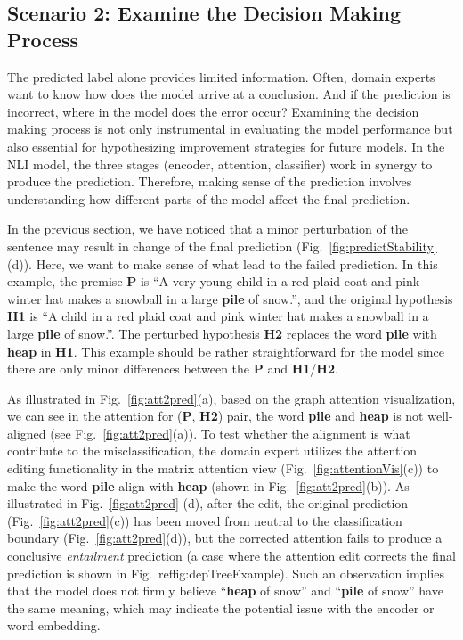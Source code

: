 \subsection{Scenario 2: Examine the Decision Making Process}
The predicted label alone provides limited information. Often, domain experts want to know how does the model arrive at a conclusion. And if the prediction is incorrect, where in the model does the error occur?
Examining the decision making process is not only instrumental in evaluating the model performance but also essential for hypothesizing improvement strategies for future models.
%
In the NLI model, the three stages (encoder, attention, classifier) work in synergy to produce the prediction.
Therefore, making sense of the prediction involves understanding how different parts of the model affect the final prediction.

In the previous section, we have noticed that a minor perturbation of the sentence may result in change of the final prediction (Fig.~\ref{fig:predictStability}(d)). Here, we want to make sense of what lead to the failed prediction. In this example, the premise \textbf{P} is ``A very young child in a red plaid coat and pink winter hat makes a snowball in a large \textbf{pile} of snow.'', and the original hypothesis \textbf{H1} is ``A child in a red plaid coat and pink winter hat makes a snowball in a large \textbf{pile} of snow.''. The perturbed hypothesis \textbf{H2} replaces the word \textbf{pile} with \textbf{heap} in \textbf{H1}. This example should be rather straightforward for the model since there are only minor differences between the \textbf{P} and \textbf{H1}/\textbf{H2}.

As illustrated in Fig.~\ref{fig:att2pred}(a), based on the graph attention visualization, we can see in the attention for (\textbf{P}, \textbf{H2}) pair, the word \textbf{pile} and \textbf{heap} is not well-aligned (see Fig.~\ref{fig:att2pred}(a)).
%
To test whether the alignment is what contribute to the misclassification, the domain expert utilizes the attention editing functionality in the matrix attention view (Fig.~\ref{fig:attentionVis}(c)) to make the word \textbf{pile} align with \textbf{heap} (shown in Fig.~\ref{fig:att2pred}(b)).
%
As illustrated in Fig.~\ref{fig:att2pred} (d), after the edit, the original prediction (Fig.~\ref{fig:att2pred}(c)) has been moved from neutral to the classification boundary (Fig.~\ref{fig:att2pred}(d)), but the corrected attention fails to produce a conclusive \emph{entailment} prediction (a case where the attention edit corrects the final prediction is shown in Fig.~ref{fig:depTreeExample}).
%
Such an observation implies that the model does not firmly believe ``\textbf{heap} of snow'' and ``\textbf{pile} of snow'' have the same meaning, which may indicate the potential issue with the encoder or word embedding.



